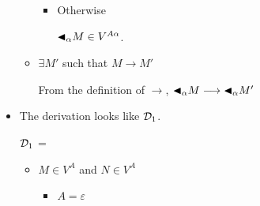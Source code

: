 \begin{itemize}
\begin{itemize}
\begin{itemize}
	      	      	\item Otherwise
	      	      	      	      	      	      	      	      	      	      	      	      	      	      	      	      	      	      		      	      	      	      	      	      	      	      	      	      	      	      
	      	      	      $ {\mathop{\blacktriangleleft}}_\alpha M \in V^{A\alpha}$.
	      	      \end{itemize}
	      	      	      	      	      	      	      	      	      	      	      	      		      	      	      	      	      	      	      	      
	      	\item $\exists M'$ such that $M \longrightarrow M'$
	      	      	      	      	      	      	      	      	      	      	      	      		      	      	      	      	      	      	      	      
	      	      From the definition of $ \longrightarrow $, ${\mathop{\blacktriangleleft}}_\alpha M \longrightarrow {\mathop{\blacktriangleleft}}_\alpha M'$
	      	      	      	      	      	      	      	      	      	      	      	      		      	      	      	      	      	      	      	      
	      \end{itemize}
	      	      	      	      	      	      		      	      	      	      
	\item \TApp
	      	      	      	      	      	      		      	      	      	      
	      The derivation looks like $\mathcal{D}_1$.
	      	      	      	      	      	      		      	      	      	      
	      $\mathcal{D}_1$ = 
	      { \andalso {}}
	      	      	      	      	      	      		      	      	      	      
	      \begin{itemize}
	      	\item $M \in V^A$ and $N \in V^A$
	      	      	      	      	      	      	      	      	      	      	      	      		      	      	      	      	      	      	      	      
	      	      \begin{itemize}
	      	      	\item $A=\varepsilon$
	      	      	      	      	      	      	      	      	      	      	      	      	      	      	      	      	      	      		      	      	      	      	      	      	      	      	      	      	      	      

\end{itemize}
\end{itemize}
\end{itemize}
